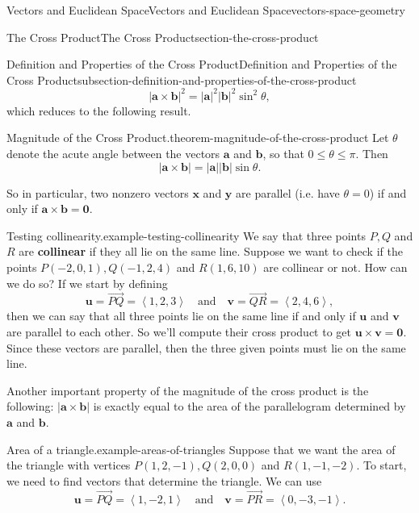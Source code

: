 \documentclass[oneside,10pt,]{book}
\newcommand{\terminology}[1]{\textbf{#1}}
\numberwithin{equation}{section}
\newcommand{\vv}[1]{\mathbf{#1}}
\newcommand{\dotprod}[1]{\left\langle #1 \right\rangle}
\begin{document}
\begin{chapterptx}{Vectors and Euclidean Space}{}{Vectors and Euclidean Space}{}{}{vectors-space-geometry}
\begin{sectionptx}{The Cross Product}{}{The Cross Product}{}{}{section-the-cross-product}
\begin{subsectionptx}{Definition and Properties of the Cross Product}{}{Definition and Properties of the Cross Product}{}{}{subsection-definition-and-properties-of-the-cross-product}
%
\begin{equation*}
|\vv{a}\times\vv{b}|^{2} = |\vv{a}|^{2}|\vv{b}|^{2}\sin^{2}\theta,
\end{equation*}
\hypertarget{p-1176}{}%
which reduces to the following result.%
\begin{theorem}{Magnitude of the Cross Product.}{}{theorem-magnitude-of-the-cross-product}%
\hypertarget{p-1177}{}%
Let \(\theta\) denote the acute angle between the vectors \(\vv{a}\) and \(\vv{b}\), so that \(0\leq\theta\leq\pi\). Then%
%
\begin{equation*}
|\vv{a}\times\vv{b}| = |\vv{a}||\vv{b}|\sin\theta.
\end{equation*}
\end{theorem}
\hypertarget{p-1178}{}%
So in particular, two nonzero vectors \(\vv{x}\) and \(\vv{y}\) are parallel (i.e. have \(\theta=0\)) if and only if \(\vv{a}\times\vv{b} = \vv{0}\).%
\begin{example}{Testing collinearity.}{example-testing-collinearity}%
\hypertarget{p-1179}{}%
We say that three points \(P,Q\) and \(R\) are \terminology{collinear} if they all lie on the same line. Suppose we want to check if the points \(P(-2,0,1), Q(-1,2,4)\) and \(R(1,6,10)\) are collinear or not. How can we do so? If we start by defining%
%
\begin{equation*}
\vv{u} = \vec{PQ} = \dotprod{1,2,3}\quad\text{and}\quad \vv{v} = \vec{QR} = \dotprod{2,4,6},
\end{equation*}
\hypertarget{p-1180}{}%
then we can say that all three points lie on the same line if and only if \(\vv{u}\) and \(\vv{v}\) are parallel to each other. So we'll compute their cross product to get \(\vv{u}\times\vv{v} = \vv{0}\). Since these vectors are parallel, then the three given points must lie on the same line.%
\end{example}
\hypertarget{p-1181}{}%
Another important property of the magnitude of the cross product is the following: \(|\vv{a}\times\vv{b}|\) is exactly equal to the area of the parallelogram determined by \(\vv{a}\) and \(\vv{b}\).%
\begin{example}{Area of a triangle.}{example-areas-of-triangles}%
\hypertarget{p-1182}{}%
Suppose that we want the area of the triangle with vertices \(P(1,2,-1), Q(2,0,0)\) and \(R(1,-1,-2)\). To start, we need to find vectors that determine the triangle. We can use%
%
\begin{equation*}
\vv{u} = \vec{PQ} = \dotprod{1,-2,1}\quad\text{and}\quad\vv{v} = \vec{PR} = \dotprod{0,-3,-1}.

\end{equation*}
\end{example}
\end{subsectionptx}
\end{sectionptx}
\end{chapterptx}
\end{document}
